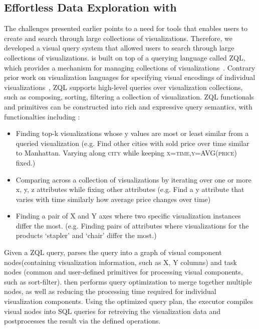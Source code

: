 \subsection{Effortless Data Exploration with \zv}
\par The challenges presented earlier points to a need for tools that enables users to create and search through large collections of visualizations. Therefore, we developed \zv a visual query system that allowed users to search through large collections of visualizations. \zv is built on top of a querying language called ZQL, which provides a mechanism for managing collections of visualizations~\cite{Siddiqui2016}. Contrary prior work on visualization languages for specifying visual encodings of individual visualizations~\cite{Stolte2002,Wilkinson2005}, ZQL supports high-level queries over visualization collections, such as composing, sorting, filtering a collection of visualization. ZQL functionals and primitives can be constructed into rich and expressive query semantics, with functionalties including : 
\begin{itemize}
	\item Finding top-k visualizations whose y values are most or least similar from a queried visualization (e.g. Find other cities with sold price over time similar to Manhattan. Varying along \textsc{city} while keeping \textsc{x=time,y=AVG(price)} fixed.) 
	\item Comparing across a collection of visualizations by iterating over one or more x, y, z attributes while fixing other attributes (e.g. Find a y attribute that varies with time similarly how average price changes over time)
	\item Finding a pair of X and Y axes where two specific visualization instances differ the most. (e.g. Finding pairs of attributes where visualizations for the products `stapler' and `chair' differ the most.)
\end{itemize}
\par Given a ZQL query, \zv parses the query into a graph of visual component nodes(containing visualization information, such as X, Y columns) and task nodes (common and user-defined primitives for processing visual components, such as sort-filter). \zv then performs query optimization to merge together multiple nodes, as well as reducing the processing time required for individual visualization components. Using the optimized query plan, the executor compiles visual nodes into SQL queries for retreiving the visualization data and postprocesses the result via the defined operations. 
